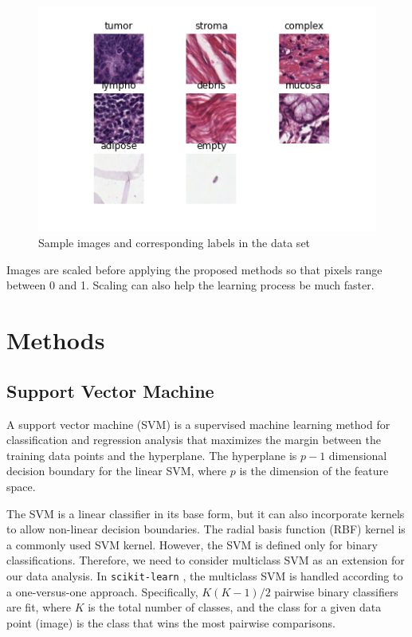 \documentclass[letterpaper]{article} %
\begin{document}
\begin{figure}[t]
\centering
\includegraphics[width=0.9\columnwidth]{figures/intro.png} 
\caption{Sample images and corresponding labels in the data set}
\label{fig1}
\end{figure}

Images are scaled before applying the proposed methods so that pixels range between 0 and 1. Scaling can also help the learning process be much faster. 

\section{Methods}

\subsection{Support Vector Machine}

A support vector machine (SVM) \cite{boser1992training} is a supervised machine learning method for classification and regression analysis that maximizes the margin between the training data points and the hyperplane. The hyperplane is $p-1$ dimensional decision boundary for the linear SVM, where $p$ is the dimension of the feature space. 

The SVM is a linear classifier in its base form, but it can also incorporate kernels to allow non-linear decision boundaries. The radial basis function (RBF) kernel is a commonly used SVM kernel. However, the SVM is defined only for binary classifications. Therefore, we need to consider multiclass SVM as an extension for our data analysis. In \texttt{scikit-learn} \cite{scikit-learn}, the multiclass SVM is handled according to a one-versus-one approach. Specifically, $K(K-1)/2$ pairwise binary classifiers are fit, where $K$ is the total number of classes, and the class for a given data point (image) is the class that wins the most pairwise comparisons.
\end{document}
